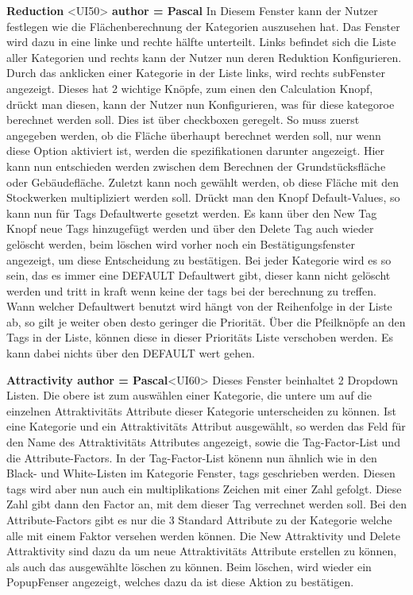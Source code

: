 \documentclass[parskip=full]{scrartcl} %
\begin{document}
\textbf{Reduction }<UI50>\textbf{ author = Pascal}
In Diesem Fenster kann der Nutzer festlegen wie die Flächenberechnung der Kategorien auszusehen hat.
Das Fenster wird dazu in eine linke und rechte hälfte unterteilt.
Links befindet sich die Liste aller Kategorien und rechts kann der Nutzer nun deren Reduktion Konfigurieren.
Durch das anklicken einer Kategorie in der Liste links, wird rechts subFenster angezeigt. Dieses hat 2 wichtige Knöpfe, zum einen den Calculation Knopf, drückt man diesen, kann der Nutzer nun Konfigurieren, was für diese kategoroe berechnet werden soll. Dies ist über checkboxen geregelt. So muss zuerst angegeben werden, ob die Fläche überhaupt berechnet werden soll, nur wenn diese Option aktiviert ist, werden die spezifikationen darunter angezeigt. Hier kann nun entschieden werden zwischen dem Berechnen der Grundstücksfläche oder Gebäudefläche. Zuletzt kann noch gewählt werden, ob diese Fläche mit den Stockwerken multipliziert werden soll.
Drückt man den Knopf Default-Values, so kann nun für Tags Defaultwerte gesetzt werden. Es kann über den New Tag Knopf neue Tags hinzugefügt werden und über den Delete Tag auch wieder gelöscht werden, beim löschen wird vorher noch ein Bestätigungsfenster angezeigt, um diese Entscheidung zu bestätigen.
Bei jeder Kategorie wird es so sein, das es immer eine DEFAULT Defaultwert gibt, dieser kann nicht gelöscht werden und tritt in kraft wenn keine der tags bei der berechnung zu treffen.
Wann welcher Defaultwert benutzt wird hängt von der Reihenfolge in der Liste ab, so gilt je weiter oben desto geringer die Priorität. Über die Pfeilknöpfe an den Tags in der Liste, können diese in dieser Prioritäts Liste verschoben werden. Es kann dabei nichts über den DEFAULT wert gehen.

\textbf{Attractivity author = Pascal}<UI60>
Dieses Fenster beinhaltet 2 Dropdown Listen. Die obere ist zum auswählen einer Kategorie, die untere um auf die einzelnen Attraktivitäts Attribute dieser Kategorie unterscheiden zu können.
Ist eine Kategorie und ein Attraktivitäts Attribut ausgewählt, so werden das Feld für den Name des Attraktivitäts Attributes angezeigt, sowie die Tag-Factor-List und die Attribute-Factors.
In der Tag-Factor-List könenn nun ähnlich wie in den Black- und White-Listen im Kategorie Fenster, tags geschrieben werden. Diesen tags wird aber nun auch ein multiplikations Zeichen mit einer Zahl gefolgt. Diese Zahl gibt dann den Factor an, mit dem dieser Tag verrechnet werden soll.
Bei den Attribute-Factors gibt es nur die 3 Standard Attribute zu der Kategorie welche alle mit einem Faktor versehen werden können.
Die New Attraktivity und Delete Attraktivity sind dazu da um neue Attraktivitäts Attribute erstellen zu können, als auch das ausgewählte löschen zu können. Beim löschen, wird wieder ein PopupFenser angezeigt, welches dazu da ist diese Aktion zu bestätigen.
\end{document}
